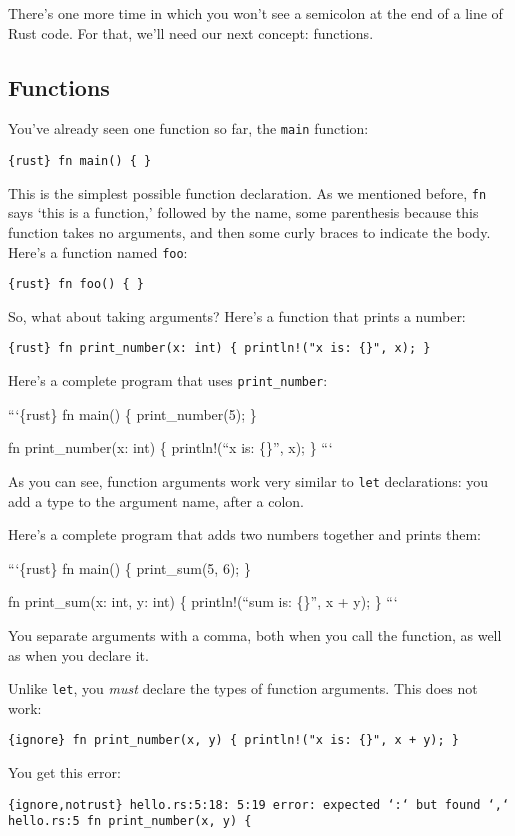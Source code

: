 \documentclass[]{article}
\begin{document}
There's one more time in which you won't see a semicolon at the end of a
line of Rust code. For that, we'll need our next concept: functions.

\subsection{Functions}\label{functions}

You've already seen one function so far, the \texttt{main} function:

\texttt{\{rust\} fn main() \{ \}}

This is the simplest possible function declaration. As we mentioned
before, \texttt{fn} says `this is a function,' followed by the name,
some parenthesis because this function takes no arguments, and then some
curly braces to indicate the body. Here's a function named \texttt{foo}:

\texttt{\{rust\} fn foo() \{ \}}

So, what about taking arguments? Here's a function that prints a number:

\texttt{\{rust\} fn print\_number(x: int) \{     println!("x is: \{\}", x); \}}

Here's a complete program that uses \texttt{print\_number}:

```\{rust\} fn main() \{ print\_number(5); \}

fn print\_number(x: int) \{ println!(``x is: \{\}'', x); \} ```

As you can see, function arguments work very similar to \texttt{let}
declarations: you add a type to the argument name, after a colon.

Here's a complete program that adds two numbers together and prints
them:

```\{rust\} fn main() \{ print\_sum(5, 6); \}

fn print\_sum(x: int, y: int) \{ println!(``sum is: \{\}'', x + y); \}
```

You separate arguments with a comma, both when you call the function, as
well as when you declare it.

Unlike \texttt{let}, you \emph{must} declare the types of function
arguments. This does not work:

\texttt{\{ignore\} fn print\_number(x, y) \{     println!("x is: \{\}", x + y); \}}

You get this error:

\texttt{\{ignore,notrust\} hello.rs:5:18: 5:19 error: expected `:` but found `,` hello.rs:5 fn print\_number(x, y) \{}
\end{document}
